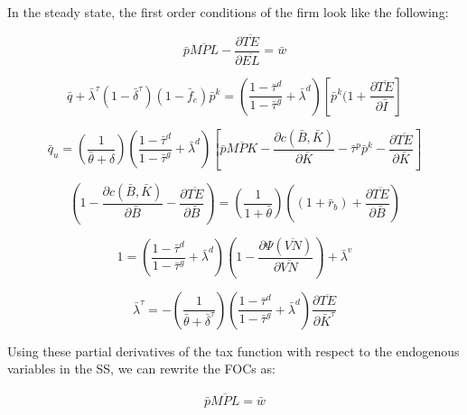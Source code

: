 In the steady state, the first order conditions of the firm look like the following:

\begin{equation}
\label{eqn:foc_l_ss}
 \bar{p}\overline{MPL} - \frac{\partial \overline{TE}}{\partial \overline{EL}}= \bar{w}
\end{equation}

 \begin{equation}
\label{eqn:foc_i_ss}
\bar{q} + \bar{\lambda}^{\tau}(1-\bar{\delta}^{\tau})(1-\bar{f}_{e})\bar{p}^{k} =  \left(\frac{1-\bar{\tau}^{d}}{1-\bar{\tau}^{g}} + \bar{\lambda}^{d}\right)\left[\bar{p}^{k}(1 + \frac{\partial \overline{TE}}{\partial \bar{I}}\right]
\end{equation}

 \begin{equation}
\label{eqn:foc_k_ss}
\bar{q}_{u} = \left(\frac{1}{\bar{\theta}+\delta}\right) \left(\frac{1-\bar{\tau}^{d}}{1-\bar{\tau}^{g}} + \bar{\lambda}^{d} \right)\left[\bar{p}\overline{MPK} - \frac{\partial c(\bar{B},\bar{K})}{\partial \bar{K}}-\bar{\tau}^{p}\bar{p}^{k}-\frac{\partial \overline{TE}}{\partial \bar{K}} \right]
\end{equation}


 \begin{equation}
\label{eqn:foc_b_ss}
\left(1-\frac{\partial c(\bar{B},\bar{K})}{\partial \bar{B}}-\frac{\partial \overline{TE}}{\partial \bar{B}}\right)=   \left(\frac{1}{1+\bar{\theta}}\right) \left((1+\bar{r}_{b})+\frac{\partial \overline{TE}}{\partial \bar{B}}\right)
\end{equation}


 \begin{equation}
\label{eqn:foc_vn_ss}
 1 = \left(\frac{1-\bar{\tau}^{d}}{1-\bar{\tau}^{g}} + \bar{\lambda}^{d}\right)\left(1-\frac{\partial \Psi(\overline{VN})}{\partial \overline{VN}}\right) + \bar{\lambda}^{v}
\end{equation}

 \begin{equation}
\label{eqn:foc_ktau_ss}
 \bar{\lambda}^{\tau} = -  \left(\frac{1}{\bar{\theta}+\bar{\delta}^{\tau}}\right)\left(\frac{1-\bar{\tau}^{d}}{1-\bar{\tau}^{g}} + \bar{\lambda}^{d} \right)\frac{\partial \overline{TE}}{\partial \bar{K}^{\tau}} 
\end{equation}

Using these partial derivatives of the tax function with respect to the endogenous variables in the SS, we can rewrite the FOCs as:


\begin{equation}
\label{eqn:foc_l_tax_ss}
\begin{split}
 \bar{p}\overline{MPL} = \bar{w} 
 \end{split}
\end{equation}

